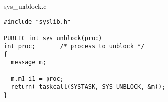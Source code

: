 sys\_unblock.c

\begin{verbatim}
#include "syslib.h"

PUBLIC int sys_unblock(proc)
int proc;		/* process to unblock */
{
  message m;

  m.m1_i1 = proc;
  return(_taskcall(SYSTASK, SYS_UNBLOCK, &m));
}
\end{verbatim}

